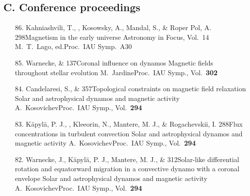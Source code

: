 \subsection*{C. Conference proceedings} %

\begin{itemize}


\item[86.]
Kahniashvili, T., \Brandenburg, Kosowsky, A., Mandal, S., \& Roper Pol, A.
{298}{Magnetism in the early universe}
{Astronomy in Focus, Vol.~14}
{M.\ T.\ Lago, ed.}{Proc.\ IAU Symp.\ A30}

\item[85.]
Warnecke, \& \Brandenburg{}
{137}{Coronal influence on dynamos}
{Magnetic fields throughout stellar evolution}
{M.\ Jardine}{Proc.\ IAU Symp., Vol.\ {\bf 302}}

\item[84.]
Candelaresi, S., \& \Brandenburg{}
{357}{Topological constraints on magnetic field relaxation}
{Solar and astrophysical dynamos and magnetic activity}
{A.\ Kosovichev}{Proc.\ IAU Symp., Vol.\ {\bf 294}}

\item[83.]
K\"apyl\"a, P. J., \Brandenburg, Kleeorin, N., Mantere, M. J., \& Rogachevskii, I.
{288}{Flux concentrations in turbulent convection}
{Solar and astrophysical dynamos and magnetic activity}
{A.\ Kosovichev}{Proc.\ IAU Symp., Vol.\ {\bf 294}}

\item[82.]
Warnecke, J., K\"apyl\"a, P. J., Mantere, M. J., \& \Brandenburg{}
{312}{Solar-like differential rotation and equatorward migration in a convective dynamo with a coronal envelope}
{Solar and astrophysical dynamos and magnetic activity}
{A.\ Kosovichev}{Proc.\ IAU Symp., Vol.\ {\bf 294}}


\end{itemize}
